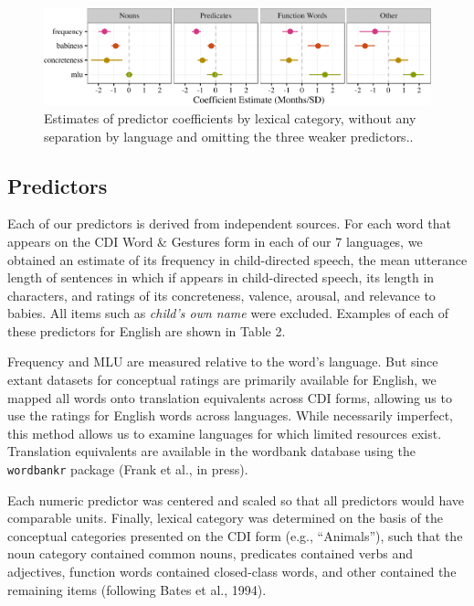 \documentclass[10pt, letterpaper]{article}
\newenvironment{CodeChunk}{}{}
\begin{document}
\begin{CodeChunk}
\begin{figure}[tb]

{\centering \includegraphics{figs/coefs_lexcat-1} 

}

\caption[Estimates of predictor coefficients by lexical category, without any separation by language and omitting the three weaker predictors]{Estimates of predictor coefficients by lexical category, without any separation by language and omitting the three weaker predictors..}\label{fig:coefs_lexcat}
\end{figure}
\end{CodeChunk}

\subsection{Predictors}\label{predictors}

Each of our predictors is derived from independent sources. For each
word that appears on the CDI Word \& Gestures form in each of our 7
languages, we obtained an estimate of its frequency in child-directed
speech, the mean utterance length of sentences in which if appears in
child-directed speech, its length in characters, and ratings of its
concreteness, valence, arousal, and relevance to babies. All items such
as \emph{child's own name} were excluded. Examples of each of these
predictors for English are shown in Table 2.

Frequency and MLU are measured relative to the word's language. But
since extant datasets for conceptual ratings are primarily available for
English, we mapped all words onto translation equivalents across CDI
forms, allowing us to use the ratings for English words across
languages. While necessarily imperfect, this method allows us to examine
languages for which limited resources exist. Translation equivalents are
available in the wordbank database using the \texttt{wordbankr} package
(Frank et al., in press).

Each numeric predictor was centered and scaled so that all predictors
would have comparable units. Finally, lexical category was determined on
the basis of the conceptual categories presented on the CDI form (e.g.,
``Animals''), such that the noun category contained common nouns,
predicates contained verbs and adjectives, function words contained
closed-class words, and other contained the remaining items (following
Bates et al., 1994).
\end{document}
